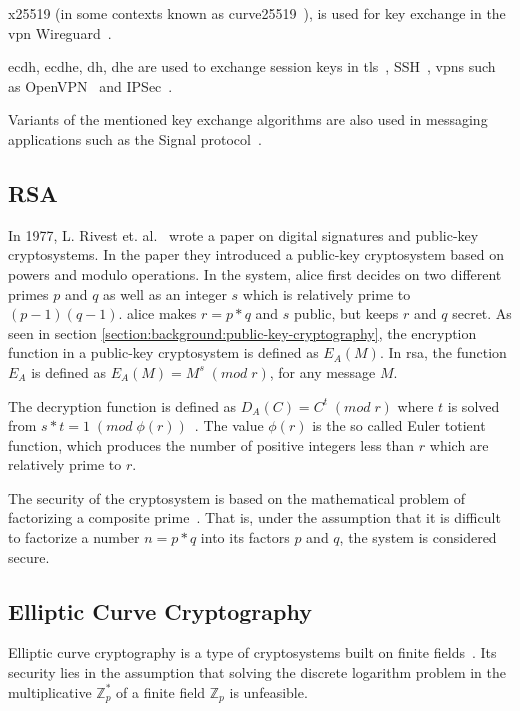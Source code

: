 \gls{x25519} (in some contexts known as \gls{curve25519}~\cite{25519naming}), is used for key exchange in the \gls{vpn} Wireguard~\cite{wireguard2020}.

\gls{ecdh}, \gls{ecdhe}, \gls{dh}, \gls{dhe} are used to exchange session keys in \gls{tls}~\cite{rfc8446}, SSH~\cite{williams2011}, \glspl{vpn} such as OpenVPN~\cite{openvpn} and IPSec~\cite{rfc2409}.

Variants of the mentioned key exchange algorithms are also used in messaging applications such as the Signal protocol~\cite{gordon2017}.

\subsection{RSA}

In 1977, L. Rivest et. al.~\cite{rsa1977} wrote a paper on digital signatures and public-key cryptosystems. In the paper they introduced a public-key cryptosystem based on powers and modulo operations. In the system, \gls{alice} first decides on two different primes $p$ and $q$ as well as an integer $s$ which is relatively prime to $(p-1)(q-1)$. \gls{alice} makes $r=p*q$ and $s$ public, but keeps $r$ and $q$ secret. As seen in section \ref{section:background:public-key-cryptography}, the encryption function in a public-key cryptosystem is defined as $E_A(M)$. In \gls{rsa}, the function $E_A$ is defined as $E_A(M)=M^s\;(mod\;r)$, for any message $M$.

The decryption function is defined as $D_A(C)=C^t\;(mod\;r)$ where $t$ is solved from $s*t=1\;(mod\;\phi(r))$~\cite{rsa1977}. The value $\phi(r)$ is the so called Euler totient function, which produces the number of positive integers less than $r$ which are relatively prime to $r$.

The security of the cryptosystem is based on the mathematical problem of factorizing a composite prime~\cite{rsa1977}. That is, under the assumption that it is difficult to factorize a number $n=p*q$ into its factors $p$ and $q$, the system is considered secure.

\subsection{Elliptic Curve Cryptography}

Elliptic curve cryptography is a type of cryptosystems built on finite fields~\cite{delfs2007}. Its security lies in the assumption that solving the discrete logarithm problem in the multiplicative $\mathbb{Z}_p^*$ of a finite field $\mathbb{Z}_p$ is unfeasible.

